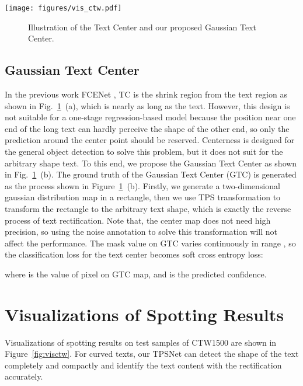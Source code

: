 \documentclass[sigconf]{acmart}
\begin{document}
	\begin{figure*}[t]
		\centering
		\texttt{[image: figures/vis\_ctw.pdf]}
		\caption{Visualizations of spotting results on test samples of CTW1500. Green lines are detection results, and the recognition results are marked nearby.}
		\label{fig:visctw}
	\end{figure*}
	
	\begin{figure}
		\centering
		\setlength{\abovecaptionskip}{5px}
		\subfigbottomskip=-3pt
		\subfigcapskip=-5pt
\vspace{2pt}
		\caption{Illustration of the Text Center \cite{long2018textsnake,zhu2021fourier} and our proposed Gaussian Text Center.}
		\label{fig:gauss_center}
		\vspace{-10px}
	\end{figure}
	
	\subsection{Gaussian Text Center}
	\label{sec:b2}
	In the previous work FCENet \cite{zhu2021fourier}, TC is the shrink region from the text region as shown in Fig.~\ref{fig:gauss_center}~(a), which is nearly as long as the text. However, this design is not suitable for a one-stage regression-based model because the position near one end of the long text can hardly perceive the shape of the other end, so only the prediction around the center point should be reserved. 
	Centerness \cite{Tian2019FCOS} is designed for the general object detection to solve this problem, but it does not suit for the arbitrary shape text. To this end, we propose the Gaussian Text Center as shown in Fig.~\ref{fig:gauss_center}~(b). 
The ground truth of the Gaussian Text Center (GTC) is generated as the process shown in Figure~\ref{fig:gauss_center}~(b). Firstly, we generate a two-dimensional gaussian distribution map in a rectangle, then we use TPS transformation to transform the rectangle to the arbitrary text shape, which is exactly the reverse process of text rectification. Note that, the center map does not need high precision, so using the noise annotation to solve this transformation will not affect the performance. The mask value on GTC varies continuously in range , so the classification loss for the text center  becomes soft cross entropy loss:
	
	where  is the value of  pixel on GTC map, and  is the predicted confidence.
	
\section{Visualizations of Spotting Results}
	Visualizations of spotting results on test samples of CTW1500 are shown in Figure~\ref{fig:visctw}.  For curved texts, our TPSNet can detect the shape of the text completely and compactly and  identify the text content with the rectification accurately.
	
	
	
\end{document}
